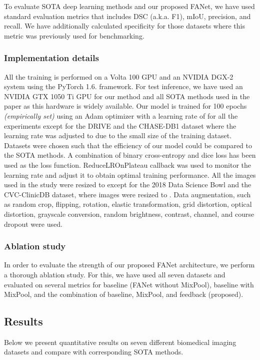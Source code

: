 \documentclass[journal]{IEEEtran}
\begin{document}
To evaluate \ac{SOTA} deep learning methods and our proposed FANet, we have used standard evaluation metrics that includes \ac{DSC} (a.k.a. F1), \ac{mIoU}, precision, and recall. We have additionally calculated specificity for those datasets where this metric was previously used for benchmarking.  

\subsubsection{Implementation details}
All the training is performed on a Volta 100 GPU and an NVIDIA DGX-2 system using the PyTorch 1.6. framework. For test inference, we have used an NVIDIA GTX 1050 Ti GPU for our method and all \ac{SOTA} methods used in the paper as this hardware is widely available. Our model is trained for 100 epochs \textit{(empirically set)} using an Adam optimizer with a learning rate of  for all the experiments except for the \ac{DRIVE} and the CHASE-DB1 dataset where the learning rate was adjusted to  due to the small size of the training dataset. Datasets were chosen such that the efficiency of our model could be compared to the \ac{SOTA} methods. A combination of binary cross-entropy and dice loss has been used as the loss function. ReduceLROnPlateau callback was used to monitor the learning rate and adjust it to obtain optimal training performance. All the images used in the study were resized to  except for the 2018 Data Science Bowl and the CVC-ClinicDB dataset, where images were resized to . Data augmentation, such as random crop, flipping, rotation, elastic transformation, grid distortion, optical distortion, grayscale conversion, random brightness, contrast, channel, and course dropout were used. 



\subsubsection{Ablation study}
In order to evaluate the strength of our proposed FANet architecture, we perform a thorough ablation study. For this, we have used all seven datasets and evaluated on several metrics for baseline (FANet without MixPool), baseline with MixPool, and the combination of baseline, MixPool, and feedback (proposed).
\subsection{Results}
\label{result}
Below we present quantitative results on seven different biomedical imaging datasets and compare with corresponding \ac{SOTA} methods. 
\end{document}
